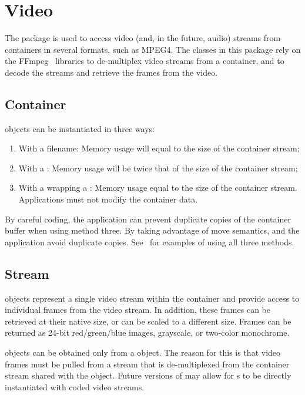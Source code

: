 %
%
\chapter{Video}
\label{chp-video}

The  package is used to access video (and, in the future,
audio) streams from containers in several formats, such as MPEG4. The classes
in this package rely on the FFmpeg~\cite{libffmpeg} libraries to de-multiplex
video streams from a container, and to decode the streams and retrieve the
frames from the video.

\section{Container}
\label{sec-videocontainer}

 objects can be instantiated in three ways:
\begin{enumerate}
\item With a filename: Memory usage will equal to the size of the container
stream;
\item With a : Memory usage will be twice that of
the size of the container stream;
\item With a  wrapping a :
Memory usage equal to the size of the container stream. Applications
must not modify the container data.
\end{enumerate}

By careful coding, the application can prevent duplicate copies of the container
buffer when using method three. By taking advantage of \CppXI move semantics,
\sname and the application avoid duplicate copies.
See~ for examples of using all three methods.

\section{Stream}
\label{sec-videostream}

 objects represent a single video stream within the container
and provide access to individual frames from the video stream. In addition,
these frames can be retrieved at their native size, or can be scaled to a
different size. Frames can be returned as 24-bit red/green/blue images,
grayscale, or two-color monochrome.

 objects can be obtained only from a  object.
The reason for this is that video frames must be pulled from a stream that
is de-multiplexed from the container stream shared with the 
object. Future versions of \sname may allow for s to be directly
instantiated with coded video streams.

